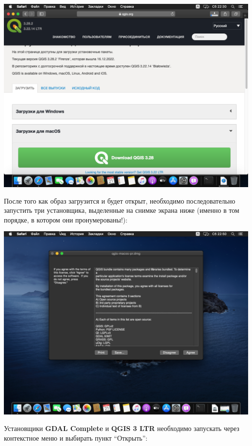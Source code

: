 \documentclass[
  12pt,
]{book}
\begin{document}
\includegraphics{images/installation_instruction_mac/mac01.png}

После того как образ загрузится и будет открыт, необходимо последовательно запустить три установщика, выделенные на снимке экрана ниже (именно в том порядке, в котором они пронумерованы!):

\includegraphics{images/installation_instruction_mac/mac02.png}

Установщики \textbf{GDAL Complete} и \textbf{QGIS 3 LTR} необходимо запускать через контекстное меню и выбирать пункт ``Открыть'':
\end{document}
